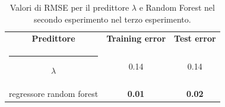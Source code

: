 \documentclass[12pt]{report}
\makeatletter
\theoremstyle{definition}
\newcommand{\thickhline}{%
    \noalign {\ifnum 0=`}\fi \hrule height 1pt
    \futurelet \reserved@a \@xhline
}
\makeatother
\begin{document}
\begin{table}
\centering
\begin{adjustbox}{max width=\textwidth}
 \begin{tabular}{|c|c|c|} 
 \hline
\textbf{Predittore} & \textbf{Training error} & \textbf{Test error}
\\ [0.5ex] 
 \thickhline
 $\lambda$ & 0.14 & 0.14 \\
 regressore random forest & \textbf{0.01} & \textbf{0.02}
 \\
 \hline
\end{tabular}
\end{adjustbox}
\caption{Valori di RMSE per il predittore $\lambda$ e Random Forest nel secondo esperimento nel terzo esperimento.}
\label{rmse_exp3}
\end{table}
\end{document}

